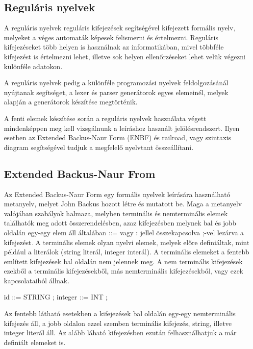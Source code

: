 
\subsection{Reguláris nyelvek}

A reguláris nyelvek reguláris kifejezések segítségével kifejezett formális nyelv, melyeket a véges automaták képesek felismerni és értelmezni. Reguláris kifejezéseket több helyen is használnak az informatikában, mivel többféle kifejezést is értelmezni lehet, illetve sok helyen ellenőrzéseket lehet velük végezni különféle adatokon.

A reguláris nyelvek pedig a különféle programozási nyelvek feldolgozásánál nyújtanak segítséget, a lexer és parser generátorok egyes elemeinél, melyek alapján a generátorok készítése megtörténik.

A fenti elemek készítése során a reguláris nyelvek használata végett mindenképpen meg kell vizsgálnunk a leíráshoz használt jelölésrendszert. Ilyen esetben az Extended Backus-Naur Form (ENBF) és railroad, vagy szintaxis diagram segítségével tudjuk a megfelelő nyelvtant összeállítani.

\subsection{Extended Backus-Naur From}

Az Extended Backus-Naur Form egy formális nyelvek leírására használható metanyelv, melyet John Backus hozott létre és mutatott be. Maga a metanyelv valójában szabályok halmaza, melyben terminális és nemterminális elemek találhatók meg adott összerendelésben, azaz kifejezésben melynek bal és jobb oldalán egy-egy elem áll általában ::= vagy : jellel összekapcsolva ;-vel lezárva a kifejezést. A terminális elemek olyan nyelvi elemek, melyek előre definiáltak, mint például a literálok (string literál, integer interál). A terminális elemeket a fentebb említett kifejezések bal oldalán nem jelennek meg.
A nem terminális kifejezések ezekből a terminális kifejezésekből, más nemterminális kifejezésekből, vagy ezek kapcsolataiból állnak.

id ::= 	STRING
	;
integer ::= INT
	;

Az fentebb látható esetekben a kifejezések bal oldalán egy-egy nemterminális kifejezés áll, a jobb oldalon ezzel szemben terminális kifejezés, string, illetve integer literál áll. Az alább láható kifejezésben ezután felhasználhatjuk a már definiált elemeket is.

